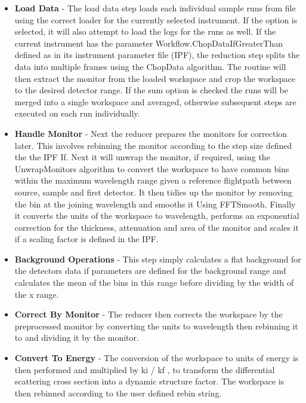 \documentclass[paper=a4, fontsize=11pt]{scrartcl}	%
\numberwithin{equation}{section}															%
\numberwithin{figure}{section}																%
\numberwithin{table}{section}																%
\begin{document}
\begin{itemize}
\item \textbf{Load Data} - The load data step loads each individual sample runs from file using the correct loader for the currently selected instrument. If the option is selected, it will also attempt to load the logs for the runs as well. If the current instrument has the parameter Workflow.ChopDataIfGreaterThan defined as in its instrument parameter file (IPF), the reduction step splits the data into multiple frames using the ChopData algorithm. The routine will then extract the monitor from the loaded workspace and crop the workspace to the desired detector range. If the sum option is checked the runs will be merged into a single workspace and averaged, otherwise subsequent steps are executed on each run individually.

\item \textbf{Handle Monitor} - Next the reducer prepares the monitors for correction later. This involves rebinning the monitor according to the step size defined the the IPF If. Next it will unwrap the monitor, if required, using the UnwrapMonitors algorithm to convert the workspace to have common bins within the maximum wavelength range given a reference flightpath between source, sample and first detector. It then tidies up the monitor by removing the bin at the joining wavelength and smooths it Using FFTSmooth. Finally it converts the units of the workspace to wavelength, performs an exponential correction for the thickness, attenuation and area of the monitor and scales it if a scaling factor is defined in the IPF.

\item \textbf{Background Operations} - This step simply calculates a flat background for the detectors data if parameters are defined for the background range and calculates the mean of the bins in this range before dividing by the width of the x range.

\item \textbf{Correct By Monitor} - The reducer then corrects the workspace by the preprocessed monitor by converting the units to wavelength then rebinning it to and dividing it by the monitor.

\item \textbf{Convert To Energy} - The conversion of the workspace to units of energy is then performed and multiplied by ki / kf , to transform the differential scattering cross section into a dynamic structure factor. The workspace is then rebinned according to the user defined rebin string.


\end{itemize}
\end{document}
